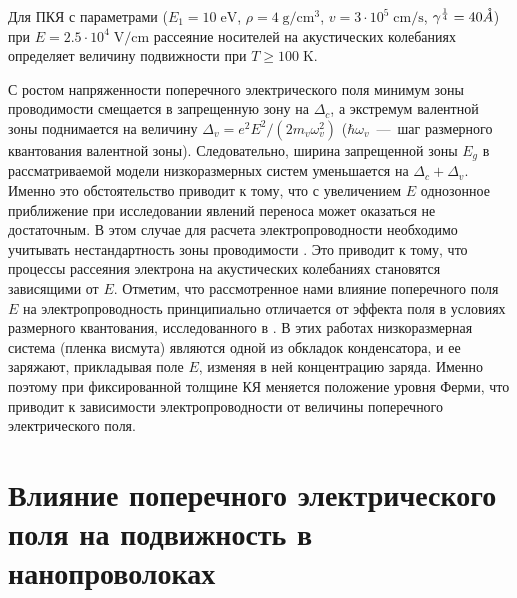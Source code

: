 Для ПКЯ с параметрами ($E_1 = 10\mathrm{\; eV}$, $\rho =4 \mathrm{\;g/cm^3}$, $v=3\cdot 10^5 \mathrm{\;cm/s}$, $\gamma^{\frac{1}{4}} = 40 \AA$) при $E=2.5\cdot 10^4 \mathrm{\;V/cm}$ рассеяние носителей на акустических колебаниях определяет величину подвижности при $T \ge 100 \mathrm{\; K}$.

С ростом напряженности поперечного электрического поля минимум зоны проводимости смещается в запрещенную зону на $\Delta_c $, а экстремум валентной зоны поднимается на величину $\Delta_v =e^2 E^2  / (2m_v  \omega_v^2 )$ ($\hbar \omega_v $~---~шаг размерного квантования валентной зоны). Следовательно, ширина запрещенной зоны $E_g$ в рассматриваемой модели низкоразмерных систем уменьшается на $\Delta_c +\Delta_v $. Именно это обстоятельство приводит к тому, что с увеличением $E$ однозонное приближение при исследовании явлений переноса может оказаться не достаточным. В этом случае для расчета электропроводности необходимо учитывать нестандартность зоны проводимости \cite{Lax1960,Cohen1961}. Это приводит к тому, что процессы рассеяния электрона на акустических колебаниях становятся зависящими от $E$. Отметим, что рассмотренное нами влияние поперечного поля $E$ на электропроводность принципиально отличается от эффекта поля в условиях размерного квантования, исследованного в \cite{Sandomirsky1967,Butenko1998}. В этих работах низкоразмерная система (пленка висмута) являются одной из обкладок конденсатора, и ее заряжают, прикладывая поле $E$, изменяя в ней концентрацию заряда. Именно поэтому при фиксированной толщине КЯ меняется положение уровня Ферми, что приводит к зависимости электропроводности от величины поперечного электрического поля.

\section{Влияние поперечного электрического поля на подвижность в нанопроволоках} \label{sect4_2}

